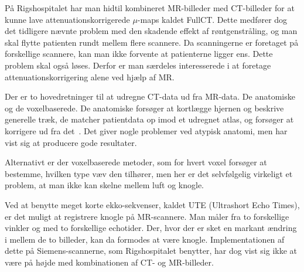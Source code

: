 På Rigshospitalet har man hidtil kombineret MR-billeder med CT-billeder
for at kunne lave attenuationskorrigerede $\mu$-maps kaldet FullCT.
Dette medfører dog det tidligere nævnte problem med den skadende
effekt af røntgenstråling, og man skal flytte patienten rundt mellem
flere scannere. Da scanningerne er foretaget på forskellige scannere,
kan man ikke forvente at patienterne ligger ens. Dette problem skal
også løses. Derfor er man særdeles interesserede i at foretage
attenuationskorrigering alene ved hjælp af MR.

Der er to hovedretninger til at udregne CT-data ud fra MR-data. De
anatomiske og de voxelbaserede. De anatomiske forsøger at kortlægge
hjernen og beskrive generelle træk, de matcher patientdata op imod
et udregnet atlas, og forsøger at korrigere ud fra det~\cite{atlas1,
atlas2}. Det giver nogle problemer ved atypisk anatomi, men har vist sig
at producere gode resultater.

Alternativt er der voxelbaserede metoder, som for hvert voxel forsøger
at bestemme, hvilken type væv den tilhører, men her er det selvfølgelig
virkeligt et problem, at man ikke kan skelne mellem luft og knogle.

Ved at benytte meget korte ekko-sekvenser, kaldet UTE (Ultrashort Echo
Times), er det muligt at registrere knogle på MR-scannere. Man måler fra
to forskellige vinkler og med to forskellige echotider. Der, hvor der er
sket en markant ændring i mellem de to billeder, kan da formodes at være
knogle. Implementationen af dette på Siemens-scannerne, som Rigshospitalet
benytter, har dog vist sig ikke at være på højde med kombinationen af
CT- og MR-billeder.

